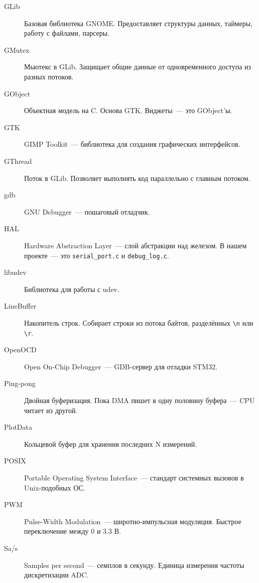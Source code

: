 \begin{description}
\item[GLib] Базовая библиотека GNOME. Предоставляет структуры данных,
    таймеры, работу с файлами, парсеры.

\item[GMutex] Мьютекс в GLib. Защищает общие данные от
    одновременного доступа из разных потоков.

\item[GObject] Объектная модель на C. Основа GTK. Виджеты~---
    это GObject'ы.

\item[GTK] GIMP Toolkit~--- библиотека для создания графических
    интерфейсов.

\item[GThread] Поток в GLib. Позволяет выполнять код
    параллельно с главным потоком.

\item[gdb] GNU Debugger~--- пошаговый отладчик.

\item[HAL] Hardware Abstraction Layer~--- слой абстракции
    над железом. В нашем проекте~--- это \texttt{serial\_port.c}
    и \texttt{debug\_log.c}.

\item[libudev] Библиотека для работы с udev.

\item[LineBuffer] Накопитель строк. Собирает строки из потока
    байтов, разделённых \texttt{\textbackslash n} или
    \texttt{\textbackslash r}.

\item[OpenOCD] Open On-Chip Debugger~--- GDB-сервер для отладки
    STM32.

\item[Ping-pong] Двойная буферизация. Пока DMA пишет в одну
    половину буфера~--- CPU читает из другой.

\item[PlotData] Кольцевой буфер для хранения последних N
    измерений.

\item[POSIX] Portable Operating System Interface~--- стандарт
    системных вызовов в Unix-подобных ОС.

\item[PWM] Pulse-Width Modulation~--- широтно-импульсная
    модуляция. Быстрое переключение между 0 и 3.3 В.

\item[Sa/s] Samples per second~--- семплов в секунду. Единица
    измерения частоты дискретизации ADC.


\end{description}
